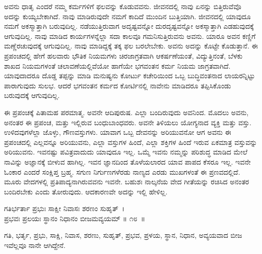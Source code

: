 ಅವನು ಧಾತೃ ಎಂದರೆ ನಮ್ಮ ಕರ್ಮಗಳಿಗೆ ಫಲವನ್ನು ಕೊಡುವವನು. ಜೀವನದಲ್ಲಿ ನಾವು ಏನನ್ನು ಬಿತ್ತಿರುವೆವೊ ಅದನ್ನು ಕುಯ್ಯಬೇಕಾಗಿದೆ. ನಾವು ಮಾಡಿರುವುದೇ ನಮಗೆ ಕಾದಿದೆ ಮುಂದಿನ ಬುತ್ತಿಯಾಗಿ. ಜೀವನದಲ್ಲಿ ಯಾವುದೂ ನಮಗೆ ಅಕಸ್ಮಾತ್ತಾಗಿ ಬರುವುದಿಲ್ಲ. ನಡೆಯುತ್ತಿರುವಾಗ ಅದೃಷ್ಟವನ್ನೋ ದುರದೃಷ್ಟವನ್ನೋ ಅಕಸ್ಮಾತ್ತಾಗಿ ಎಡಹುವುದಕ್ಕೆ ಆಗುವುದಿಲ್ಲ. ನಾವು ಮಾಡಿದ ಕಾರ್ಯಗಳನ್ನೆಲ್ಲಾ ಸದಾ ಕಾಲವೂ ಗಮನಿಸುತ್ತಿರುವನು ಅವನು. ಯಾರೂ ಅವನ ಕಣ್ಣಿಗೆ ಮಣ್ಣೆರಚುವುದಕ್ಕೆ ಆಗುವುದಿಲ್ಲ. ನಾವು ಮಾಡಿದ್ದಕ್ಕೆ ತಕ್ಕ ಫಲ ಬರಲೇಬೇಕು. ಅವನು ಅದನ್ನು ಕೊಟ್ಟೇ ಕೊಡುತ್ತಾನೆ. ಈ ಪ್ರಪಂಚದಲ್ಲಿ ಹೇಗೆ ಹಲವಾರು ಭೌತಿಕ ನಿಯಮಗಳು ಚಿರಜಾಗ್ರತವಾಗಿ ಆಕರ್ಷಣೆಯಂತೆ, ವಿದ್ಯುತ್ತಿನಂತೆ, ಬೆಳಕು ಶಾಖದ ನಿಯಮಗಳಂತೆ ಚಲಾವಣೆಯಲ್ಲಿವೆಯೋ ಹಾಗೆಯೇ ಭಗವಂತನ ಕರ್ಮ ನಿಯಮ ಜಾಗ್ರತವಾಗಿದೆ. ಯಾವು\-ದಾದರೂ ದೊಡ್ಡ ತಪ್ಪನ್ನು ಮಾಡಿ ಮನುಷ್ಯನು ಕೋರ್ಟು ಕಚೇರಿಯಿಂದ ಒಬ್ಬ ಬುದ್ಧಿವಂತನಾದ ಲಾಯರನ್ನಿಟ್ಟು ಪಾರಾಗುವುದು ಸುಲಭ. ಆದರೆ ಭಗವಂತನ ಕರ್ಮದ ಕೋರ್ಟಿನಲ್ಲಿ ನಾವೇನು ಮಾಡಿದರೂ ತಪ್ಪಿಸಿಕೊಂಡು ಬರುವುದಕ್ಕೆ ಆಗುವುದಿಲ್ಲ.

ಈ ಪ್ರಪಂಚಕ್ಕೆ ಪಿತಾಮಹ ಪರಮಾತ್ಮ. ಅವನೇ ಆದಿಪುರುಷ. ಎಲ್ಲಾ ಬಂದಿರುವುದು ಅವನಿಂದ. ಮೊದಲು ಅವನು, ಅನಂತರ ಈ ಪ್ರಪಂಚ, ಮತ್ತು ಇಲ್ಲಿರುವ ಬಂಧುಬಾಂಧವರು. ಅವನೇ ತಿಳಿಯಲು ಯೋಗ್ಯನಾದ ವ್ಯಕ್ತಿ ಮತ್ತು ವಸ್ತು. ಉಳಿದವುಗಳೆಲ್ಲಾ ಜೊಳ್ಳು, ಗೌಣವಸ್ತುಗಳು. ಯಾವಾಗ ಒಬ್ಬ ದೇವನನ್ನು ಅರಿಯುವನೋ ಆಗ ಅವನು ಈ ಪ್ರಪಂಚದಲ್ಲಿ ಎಲ್ಲವನ್ನೂ ಅರಿಯುವನು, ಎಲ್ಲಾ ವಸ್ತುಗಳ ಹಿಂದೆ, ಎಲ್ಲಾ ಶಕ್ತಿಗಳ ಹಿಂದೆ ಇರುವ ಏಕಮಾತ್ರ ವಸ್ತುವನ್ನು ಅರಿಯುವನು. ಇವನಷ್ಟು ಪವಿತ್ರವಾದುದು ಯಾವುದೂ ಇಲ್ಲ. ಒಮ್ಮೆ ಇವನು ನಮ್ಮನ್ನು ಪರಿಶುದ್ಧ ಮಾಡಿದ ಮೇಲೆ ನಾವಿನ್ನು ಅಜ್ಞಾನಕ್ಕೆ ಬೀಳುವ ಹಾಗಿಲ್ಲ. ಇವನ ಜ್ಞಾನದಿಂದ ತೊಳೆಯಲಾರದ ಯಾವ ಪಾಪದ ಕೆಸರೂ ಇಲ್ಲ. ಇವನೇ ಓಂಕಾರ ಎಂದರೆ ಸಂಕ್ಷಿಪ್ತ ಬ್ರಹ್ಮ. ಸಗುಣ ನಿರ್ಗುಣಗಳೆರಡು ನಾಣ್ಯದ ಎರಡು ಮುಖಗಳಂತೆ ಈ ಪ್ರಣವದಲ್ಲಿದೆ. ಮೂರು ವೇದಗಳಲ್ಲಿ ಪ್ರತಿಪಾದ್ಯನಾಗಿರುವವನು ಇವನೇ. ಬಹುಶಃ ನಾಲ್ಕನೆಯ ವೇದ ಗೀತೆಯನ್ನು ರಚಿಸಿದ ಅನಂತರ ಬಂದಿರಬೇಕು ಎಂದು ತೋರುವುದು. ಆದಕಾರಣವೇ ಅದನ್ನು ಇಲ್ಲಿ ಹೇಳಿಲ್ಲ.

\begin{shloka}
ಗತಿರ್ಭರ್ತಾ ಪ್ರಭುಃ ಸಾಕ್ಷೀ ನಿವಾಸಃ ಶರಣಂ ಸುಹೃತ್~।\\ಪ್ರಭವಃ ಪ್ರಲಯಃ ಸ್ಥಾನಂ ನಿಧಾನಂ ಬೀಜಮವ್ಯಯಮ್ \hfill॥ ೧೮~॥
\end{shloka}

\begin{artha}
ಗತಿ, ಭರ್ತೃ, ಪ್ರಭು, ಸಾಕ್ಷಿ, ನಿವಾಸ, ಶರಣು, ಸುಹೃತ್, ಪ್ರಭವ, ಪ್ರಳಯ, ಸ್ಥಾನ, ನಿಧಾನ, ಅವ್ಯಯವಾದ ಬೀಜ ಇವೆಲ್ಲವೂ ನಾನೇ ಆಗಿದ್ದೇನೆ.
\end{artha}

